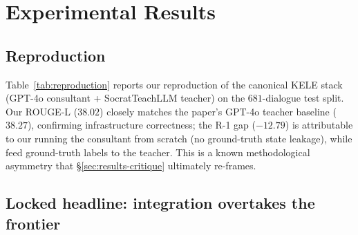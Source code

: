 \documentclass[11pt]{article}
\begin{document}
\section{Experimental Results}
\label{sec:results}

\subsection{Reproduction}

Table~\ref{tab:reproduction} reports our reproduction of the canonical KELE stack (GPT-4o consultant + SocratTeachLLM teacher) on the $681$-dialogue test split. Our ROUGE-L ($38.02$) closely matches the paper's GPT-4o teacher baseline ($38.27$), confirming infrastructure correctness; the R-1 gap ($-12.79$) is attributable to our running the consultant from scratch (no ground-truth state leakage), while \citet{peng2025kele} feed ground-truth labels to the teacher. This is a known methodological asymmetry that \S\ref{sec:results-critique} ultimately re-frames.

\begin{table}[t]
  \centering
  \small
  \caption{Reproduction on the $681$-dialogue test split. Both systems use GPT-4o consultant + SocratTeachLLM teacher.}
  \label{tab:reproduction}
\end{table}

\subsection{Locked headline: integration overtakes the frontier}
\end{document}
